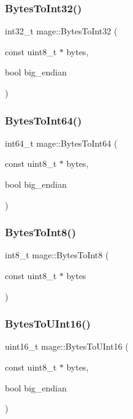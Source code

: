 \subsubsection{\texorpdfstring{Bytes\+To\+Int32()}{BytesToInt32()}}
{\footnotesize\ttfamily int32\+\_\+t mage\+::\+Bytes\+To\+Int32 (\begin{DoxyParamCaption}\item[{const uint8\+\_\+t $\ast$}]{bytes,  }\item[{bool}]{big\+\_\+endian }\end{DoxyParamCaption})}

\hypertarget{namespacemage_a09884643d0e3afe8591f9104785ce480}{}\label{namespacemage_a09884643d0e3afe8591f9104785ce480} 
\subsubsection{\texorpdfstring{Bytes\+To\+Int64()}{BytesToInt64()}}
{\footnotesize\ttfamily int64\+\_\+t mage\+::\+Bytes\+To\+Int64 (\begin{DoxyParamCaption}\item[{const uint8\+\_\+t $\ast$}]{bytes,  }\item[{bool}]{big\+\_\+endian }\end{DoxyParamCaption})}

\hypertarget{namespacemage_a1e911bf0ab208ddf9f1ca362db28069d}{}\label{namespacemage_a1e911bf0ab208ddf9f1ca362db28069d} 
\subsubsection{\texorpdfstring{Bytes\+To\+Int8()}{BytesToInt8()}}
{\footnotesize\ttfamily int8\+\_\+t mage\+::\+Bytes\+To\+Int8 (\begin{DoxyParamCaption}\item[{const uint8\+\_\+t $\ast$}]{bytes }\end{DoxyParamCaption})}

\hypertarget{namespacemage_ae7ac42dd62471c5badcd2f6c49b30e5b}{}\label{namespacemage_ae7ac42dd62471c5badcd2f6c49b30e5b} 
\subsubsection{\texorpdfstring{Bytes\+To\+U\+Int16()}{BytesToUInt16()}}
{\footnotesize\ttfamily uint16\+\_\+t mage\+::\+Bytes\+To\+U\+Int16 (\begin{DoxyParamCaption}\item[{const uint8\+\_\+t $\ast$}]{bytes,  }\item[{bool}]{big\+\_\+endian }\end{DoxyParamCaption})}


